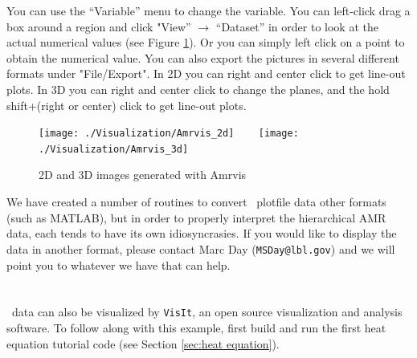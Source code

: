 \begin{enumerate}
  You can use the ``Variable'' menu to change the variable.
  You can left-click drag a box around a region
  and click "View'' $\rightarrow$ ``Dataset''
  in order to look at the actual numerical values
  (see Figure \ref{Fig:Amrvis}).
  Or you can simply left click on a point to obtain the numerical value.
  You can also export the
  pictures in several different formats under "File/Export".
  In 2D you can right and center click to get line-out plots.
  In 3D you can right and center click to change the planes, and the hold
  shift+(right or center) click to get line-out plots.

\begin{figure}[tb]
\centering
\texttt{[image: ./Visualization/Amrvis\_2d]}
~~~
\texttt{[image: ./Visualization/Amrvis\_3d]}
\caption{2D and 3D images generated with Amrvis}
\label{Fig:Amrvis}
\end{figure}

  We have created a number of routines to convert \amrex\ plotfile data
  other formats (such as MATLAB), but in order to properly interpret 
  the hierarchical AMR data, each tends to have its own idiosyncrasies.
  If you would like to display the data in another format, please contact
  Marc Day ({\tt MSDay@lbl.gov}) and we will point you to whatever we have
  that can help.

\end{enumerate}

\section{\visit}
\label{sec:visit}

\amrex\ data can also be visualized by {\tt VisIt}, an open
source visualization and analysis software.  To follow along with this example,
first build and run the first heat equation tutorial code
(see Section \ref{sec:heat equation}).

